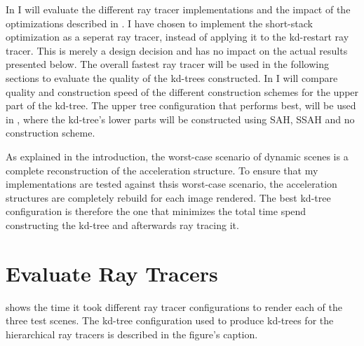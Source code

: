 
In  I will evaluate the different ray tracer
implementations and the impact of the optimizations described in
. I have chosen to implement the
short-stack optimization as a seperat ray tracer, instead of applying it to the
kd-restart ray tracer. This is merely a design decision and has no impact on the
actual results presented below. The overall fastest ray tracer will be used in
the following sections to evaluate the quality of the kd-trees constructed. In
 I will compare quality and construction speed
of the different construction schemes for the upper part of the kd-tree. The
upper tree configuration that performs best, will be used in
, where the kd-tree's lower parts will be
constructed using SAH, SSAH and no construction scheme.

As explained in the introduction, the worst-case scenario of dynamic scenes is a
complete reconstruction of the acceleration structure. To ensure that my
implementations are tested against thsis worst-case scenario, the acceleration
structures are completely rebuild for each image rendered. The best kd-tree
configuration is therefore the one that minimizes the total time spend
constructing the kd-tree and afterwards ray tracing it.


\section{Evaluate Ray Tracers}\label{sec:evaluateRayTracer}

 shows the time it took different ray tracer
configurations to render each of the three test scenes. The kd-tree
configuration used to produce kd-trees for the hierarchical ray tracers is
described in the figure's caption.

\newcommand{\tabelMoeller}{
  \begin{tabular}{c}
    Moeller- \\ Trumbore
  \end{tabular}
}

